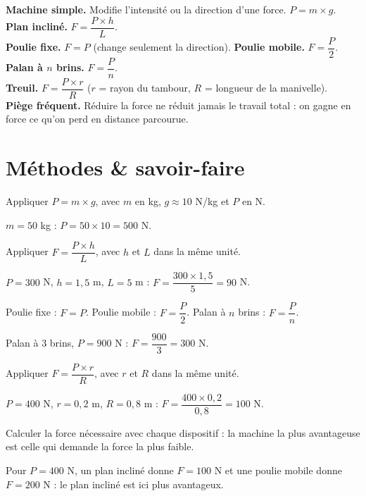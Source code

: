 \begin{synthese}
\textbf{Machine simple.} Modifie l'intensité ou la direction d'une force. $P=m\times g$.\\[4pt]
\textbf{Plan incliné.} $F=\dfrac{P\times h}{L}$.\\[4pt]
\textbf{Poulie fixe.} $F=P$ (change seulement la direction). \textbf{Poulie mobile.}
$F=\dfrac P2$.\\[4pt]
\textbf{Palan à $n$ brins.} $F=\dfrac Pn$.\\[4pt]
\textbf{Treuil.} $F=\dfrac{P\times r}{R}$ ($r$ = rayon du tambour, $R$ = longueur de la
manivelle).\\[4pt]
\textbf{Piège fréquent.} Réduire la force ne réduit jamais le travail total : on gagne en
force ce qu'on perd en distance parcourue.
\end{synthese}

\section{Méthodes \& savoir-faire}

Appliquer $P=m\times g$, avec $m$ en kg, $g\approx10$ N/kg et $P$ en N.
\begin{exemple}
$m=50$ kg : $P=50\times10=500$ N.
\end{exemple}

Appliquer $F=\dfrac{P\times h}{L}$, avec $h$ et $L$ dans la même unité.
\begin{exemple}
$P=300$ N, $h=1{,}5$ m, $L=5$ m : $F=\dfrac{300\times1{,}5}5=90$ N.
\end{exemple}

Poulie fixe : $F=P$. Poulie mobile : $F=\dfrac P2$. Palan à $n$ brins : $F=\dfrac Pn$.
\begin{exemple}
Palan à $3$ brins, $P=900$ N : $F=\dfrac{900}3=300$ N.
\end{exemple}

Appliquer $F=\dfrac{P\times r}{R}$, avec $r$ et $R$ dans la même unité.
\begin{exemple}
$P=400$ N, $r=0{,}2$ m, $R=0{,}8$ m : $F=\dfrac{400\times0{,}2}{0{,}8}=100$ N.
\end{exemple}

Calculer la force nécessaire avec chaque dispositif : la machine la plus avantageuse est
celle qui demande la force la plus faible.
\begin{exemple}
Pour $P=400$ N, un plan incliné donne $F=100$ N et une poulie mobile donne $F=200$ N : le
plan incliné est ici plus avantageux.
\end{exemple}


